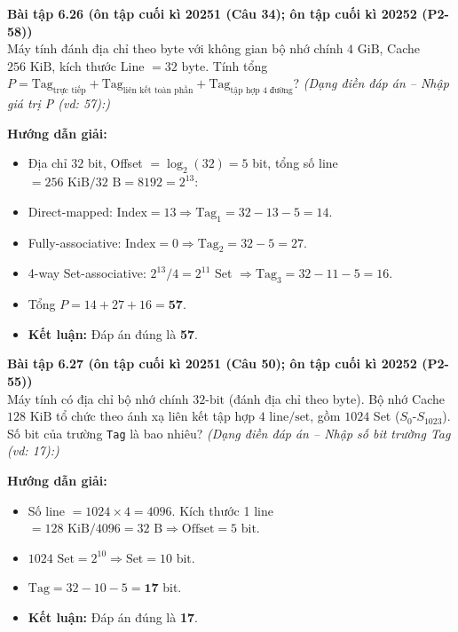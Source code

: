 \textbf{Bài tập 6.26 (ôn tập cuối kì 20251 (Câu 34); ôn tập cuối kì 20252 (P2-58))}\\
Máy tính đánh địa chỉ theo byte với không gian bộ nhớ chính $4\text{ GiB}$, Cache $256\text{ KiB}$, kích thước Line $= 32\text{ byte}$. Tính tổng $P = \text{Tag}_{\text{trực tiếp}} + \text{Tag}_{\text{liên kết toàn phần}} + \text{Tag}_{\text{tập hợp 4 đường}}$?
\textit{(Dạng điền đáp án -- Nhập giá trị P (vd: 57):)}\par
\textbf{Hướng dẫn giải:}
\begin{itemize}
    \item Địa chỉ $32$ bit, Offset $= \log_2(32) = 5$ bit, tổng số line $= 256\text{ KiB}/32\text{ B} = 8192 = 2^{13}$:
    \item Direct-mapped: $\text{Index} = 13 \Rightarrow \text{Tag}_1 = 32 - 13 - 5 = 14$.
    \item Fully-associative: $\text{Index} = 0 \Rightarrow \text{Tag}_2 = 32 - 5 = 27$.
    \item 4-way Set-associative: $2^{13}/4 = 2^{11}$ Set $\Rightarrow \text{Tag}_3 = 32 - 11 - 5 = 16$.
    \item Tổng $P = 14 + 27 + 16 = \mathbf{57}$.
    \item \textbf{Kết luận:} Đáp án đúng là \textbf{57}.
\end{itemize}

\textbf{Bài tập 6.27 (ôn tập cuối kì 20251 (Câu 50); ôn tập cuối kì 20252 (P2-55))}\\
Máy tính có địa chỉ bộ nhớ chính $32\text{-bit}$ (đánh địa chỉ theo byte). Bộ nhớ Cache $128\text{ KiB}$ tổ chức theo ánh xạ liên kết tập hợp $4\text{ line/set}$, gồm $1024$ Set ($S_0\text{-}S_{1023}$). Số bit của trường \texttt{Tag} là bao nhiêu?
\textit{(Dạng điền đáp án -- Nhập số bit trường Tag (vd: 17):)}\par
\textbf{Hướng dẫn giải:}
\begin{itemize}
    \item Số line $= 1024 \times 4 = 4096$. Kích thước 1 line $= 128\text{ KiB}/4096 = 32\text{ B} \Rightarrow \text{Offset} = 5\text{ bit}$.
    \item $1024\text{ Set} = 2^{10} \Rightarrow \text{Set} = 10\text{ bit}$.
    \item $\text{Tag} = 32 - 10 - 5 = \mathbf{17}$ bit.
    \item \textbf{Kết luận:} Đáp án đúng là \textbf{17}.
\end{itemize}

